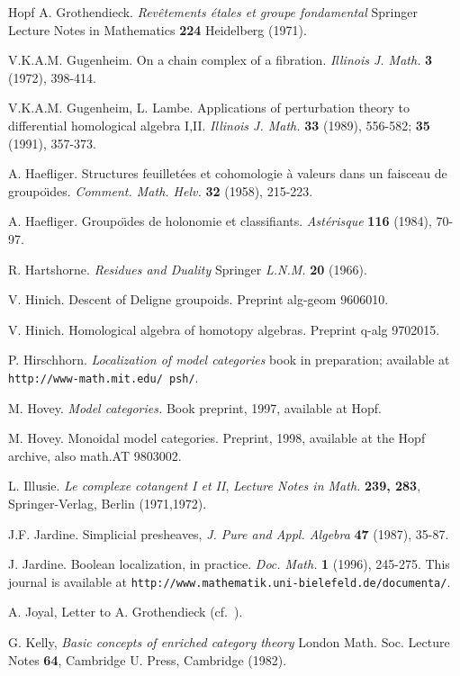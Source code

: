 \begin{thebibliography}{Hopf}
A. Grothendieck. {\em Rev\^etements \'etales et groupe fondamental}
Springer Lecture Notes in Mathematics {\bf 224} Heidelberg (1971).

V.K.A.M. Gugenheim. On a chain complex of a fibration. {\em Illinois J. Math.}
{\bf 3} (1972), 398-414.

V.K.A.M. Gugenheim, L. Lambe. Applications of perturbation theory to
differential homological algebra I,II. {\em Illinois J. Math.} {\bf 33} (1989),
556-582; {\bf 35} (1991), 357-373.

A. Haefliger. Structures feuillet\'ees et cohomologie \`a valeurs dans
un faisceau de groupo\"{\i}des. {\em Comment. Math. Helv.} {\bf 32} (1958),
215-223.

A. Haefliger. Groupo\"{\i}des de holonomie et classifiants. {\em
Ast\'erisque} {\bf 116} (1984),
70-97.

R. Hartshorne. {\em Residues and Duality} Springer {\em L.N.M.} {\bf 20}
(1966).

V. Hinich. Descent of Deligne groupoids. Preprint alg-geom 9606010.

V. Hinich. Homological algebra of homotopy algebras. Preprint q-alg 9702015.

P. Hirschhorn. {\em Localization of model categories}
book in preparation; available at
{\tt http://www-math.mit.edu/~psh/}.

M. Hovey. {\em Model categories.} Book preprint, 1997, available
at Hopf.

M. Hovey. Monoidal model categories. Preprint, 1998, available at the
Hopf archive,
also math.AT 9803002.

L. Illusie. {\em Le complexe cotangent I et II}, {\em  Lecture Notes in
Math.} {\bf 239, 283}, Springer-Verlag, Berlin (1971,1972).

J.F. Jardine.  Simplicial presheaves, {\em J. Pure and Appl. Algebra} {\bf 47}
(1987), 35-87.

J. Jardine. Boolean localization, in practice. {\em Doc. Math.} {\bf 1} (1996),
245-275. This journal is available at
{\tt http://www.mathematik.uni-bielefeld.de/documenta/}.

A. Joyal, Letter to A. Grothendieck (cf.\ \cite{Jardine}).

G. Kelly, {\em Basic concepts of enriched category theory} London Math. Soc.
Lecture Notes {\bf 64}, Cambridge U. Press, Cambridge (1982).


\end{thebibliography}
